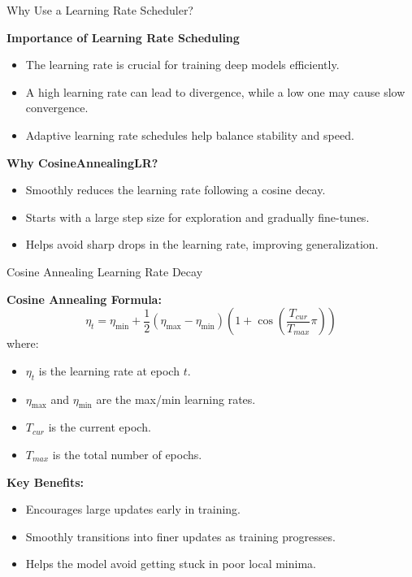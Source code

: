 \begin{frame}{Why Use a Learning Rate Scheduler?}

    \textbf{\large Importance of Learning Rate Scheduling}
    \vspace{5pt}
    \begin{itemize}
        \item The learning rate is crucial for training deep models efficiently.
        \item A high learning rate can lead to divergence, while a low one may cause slow convergence.
        \item Adaptive learning rate schedules help balance stability and speed.
    \end{itemize}

    \vspace{10pt}
    \textbf{\large Why CosineAnnealingLR?}
    \vspace{5pt}
    \begin{itemize}
        \item Smoothly reduces the learning rate following a cosine decay.
        \item Starts with a large step size for exploration and gradually fine-tunes.
        \item Helps avoid sharp drops in the learning rate, improving generalization.
    \end{itemize}

\end{frame}



\begin{frame}{Cosine Annealing Learning Rate Decay}

    \textbf{\large Cosine Annealing Formula:}
    \[
    \eta_t = \eta_{\text{min}} + \frac{1}{2} (\eta_{\text{max}} - \eta_{\text{min}}) 
    \left( 1 + \cos \left( \frac{T_{cur}}{T_{max}} \pi \right) \right)
    \]
    where:
    \begin{itemize}
        \item \( \eta_t \) is the learning rate at epoch \( t \).
        \item \( \eta_{\text{max}} \) and \( \eta_{\text{min}} \) are the max/min learning rates.
        \item \( T_{cur} \) is the current epoch.
        \item \( T_{max} \) is the total number of epochs.
    \end{itemize}

    \vspace{10pt}
    \textbf{\large Key Benefits:}
    \begin{itemize}
        \item Encourages large updates early in training.
        \item Smoothly transitions into finer updates as training progresses.
        \item Helps the model avoid getting stuck in poor local minima.
    \end{itemize}

\end{frame}


